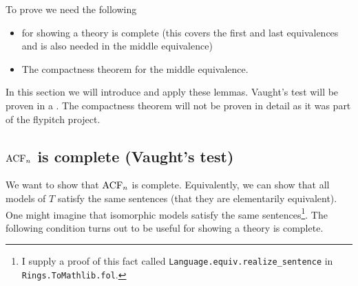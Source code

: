 

To prove  we need the following
\begin{itemize}
  \item {} for showing a theory is complete
        (this covers the first and last equivalences and
        is also needed in the middle equivalence)
  \item The compactness theorem for the middle equivalence.
\end{itemize}
In this section we will introduce and apply these lemmas.
Vaught's test will be proven in a .
The compactness theorem will not be proven
in detail as it was part of the flypitch project.

\subsection{$\operatorname{ACF}_{n}$ is complete (Vaught's test)}
We want to show that $\operatorname{ACF}_{n}$ is complete.
Equivalently, we can show that all models of $T$ satisfy the same sentences
(that they are elementarily equivalent).
One might imagine that isomorphic models satisfy the same sentences\footnote{
  I supply a proof of this fact called
  \texttt{Language.equiv.realize\_sentence} in \texttt{Rings.ToMathlib.fol}.
}.
The following condition turns out to be useful for showing a theory is complete.

